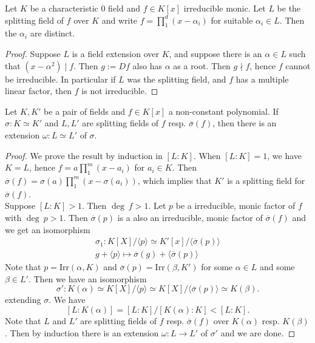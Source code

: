     \begin{lemma}
        Let $K$ be a characteristic $0$ field and $f\in K[x]$ irreducible monic. Let $L$ be the splitting field of $f$ over $K$ and write $f=\prod_1^d (x-\alpha_i)$ for suitable $\alpha_i\in L$. Then the $\alpha_i$ are distinct.
    \end{lemma}
    \begin{proof}
        Suppose $L$ is a field extension over $K$, and suppose there is an $\alpha \in L$ such that $(x-\alpha^2)\mid f$. Then $g:=D f$ also has $\alpha$ as a root. Then $g\nmid f$, hence $f$ cannot be irreducible. In particular if $L$ was the splitting field, and $f$ has a multiple linear factor, then $f$ is not irreducible.  
    \end{proof}
    \begin{lemma}\label{UniquenessOfSplittingFieldsUpToIsomorphism} Let $K,K'$ be a pair of fields and $f\in K[x]$ a non-constant polynomial. If $\sigma : K\simeq K'$ and $L,L'$ are splitting fields of $f$ resp. $\overline{\sigma}(f)$, then there is an extension $\omega : L \simeq L'$ of $\sigma$.  
    \end{lemma}
    \begin{proof}
        We prove the result by induction in $[L : K]$. When $[L : K] = 1$, we have $K=L$, hence $f = a \prod_1^m (x-a_i)$ for $a_i\in K$. Then $\overline{\sigma}(f) = \sigma(a)\prod_1^m (x-\sigma(a_i))$, which implies that $K'$ is a splitting field for $\overline{\sigma}(f)$.\\
        Suppose $[L : K] > 1$. Then $\deg \ f >1$. Let $p$ be a  irreducible, monic factor of $f$ with $\deg \ p > 1$. Then $\overline{\sigma}(p)$ is a also an irreducible, monic factor of $\overline{\sigma}(f)$ and we get an isomorphism
        \begin{gather*}
            \sigma_1 : K[X]/\langle p \rangle \simeq K'[x]/\langle \overline{\sigma}(p)\rangle\\
            g + \langle p\rangle \mapsto \overline{\sigma}(g)+\langle \overline{\sigma}(p)\rangle
        \end{gather*} 
        Note that $p = \mathrm{Irr}(\alpha,K)$ and $\overline{\sigma}(p) = \mathrm{Irr}(\beta,K')$ for some $\alpha\in L$ and some $\beta\in L'$. Then we have an isomorphism
        $$
            \sigma' :  K(\alpha) \simeq K[X]/\langle p \rangle \simeq K[X]/\langle \overline{\sigma}(p) \rangle\simeq  K(\beta). 
        $$
        extending $\sigma$. We have 
        $$
            [L:K(\alpha)] = [L : K]/[K(\alpha) : K] < [L : K].
        $$
        Note that $L$ and $L'$ are splitting fields of $f$ resp. $\overline{\sigma}(f)$ over $K(\alpha)$ resp. $K(\beta)$. Then by induction there is an extension $\omega : L \rightarrow L'$ of $\sigma'$ and we are done.  
    \end{proof}

